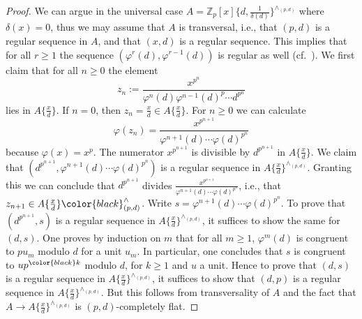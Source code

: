 \documentclass{amsart}
\theoremstyle{plain}
\theoremstyle{definition}
\newcommand{\Z}{\mathbb{Z}}
\newcommand{\red}[1]{{\color{black} #1}}
\newcommand{\green}[1]{{\color{black}#1}}
\newcommand{\blue}[1]{{\color{black}#1}}
\begin{document}
\begin{proof}
  We can argue in the universal case
  $A=\Z_p[x]\{d,\frac{1}{\delta(d)}\}^{\wedge_{(p,d)}}$ where
    $\delta(x)=0$, thus we may assume that $A$ is transversal, i.e.,
  that $(p,d)$ is a regular sequence in $A$, and that $(x,d)$ is a
  regular sequence. This implies that for all $r\geq 1$ the sequence
  $(\varphi^r(d),\varphi^{r-1}(d))$ is regular as well (cf.\
  ).
  We first claim that for all $n\geq 0$ the element
  $$
  z_n:=\frac{x^{p^n}}{\varphi^{n}(d)\varphi^{n-1}(d)^p\cdots d^{p^n}}
  $$
  lies in $A\{\frac{x}{d}\}$. If $n=0$, then $z_n=\frac{x}{d}\in A\{\frac{x}{d}\}$. For $n\geq 0$ we can calculate
  $$
  \varphi(z_n)=\frac{x^{p^{n+1}}}{\varphi^{n+1}(d)\cdots \varphi(d)^{p^n}}
  $$
  because $\varphi(x)=x^p$.
  The numerator $x^{p^{n+1}}$ is divisible by $d^{p^{n+1}}$ in $A\{\frac{x}{d}\}$. \red{We claim that $(d^{p^{n+1}},\varphi^{n+1}(d)\cdots \varphi(d)^{p^n})$ is a regular sequence in $A\{\frac{x}{d}\}^{\wedge_{(p,d)}}$. Granting this }we can conclude that $d^{p^{n+1}}$ divides $\frac{x^{p^{n+1}}}{\varphi^{n+1}(d)\cdots \varphi(d)^{p^n}}$, i.e., that $z_{n+1}\in A\{\frac{x}{d}\}\red{^\wedge_{(p,d)}}$.
    \blue{Write $s=\varphi^{n+1}(d)\cdots \varphi(d)^{p^n}$. To prove that $(d^{p^{n+1}},s)$ is a regular sequence in $A\{\frac{x}{d}\}^{\wedge_{(p,d)}}$, it suffices to show the same for $(d,s)$. One proves by induction on $m$ that for all $m\geq 1$, $\varphi^m(d)$ is congruent to $pu_m$ modulo $d$ %
    for a unit $u_m$. In particular, one concludes that $s$ is congruent to $up^{\green{k}}$ modulo $d$, for $k\geq 1$ and $u$ a unit. Hence to prove that $(d,s)$ is a regular sequence in $A\{\frac{x}{d}\}^{\wedge_{(p,d)}}$, it suffices to show that $(d,p)$ is a regular sequence in $A\{\frac{x}{d}\}^{\wedge_{(p,d)}}$. But this follows from transversality of $A$ and the fact that $A \to A\{\frac{x}{d}\}^{\wedge_{(p,d)}}$ is $(p,d)$-completely flat.}


\end{proof}
\end{document}
